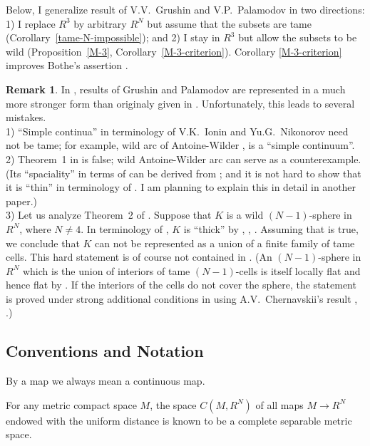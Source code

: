 \documentclass[12pt]{article}
\theoremstyle{definition}
\newtheorem{remark}[theorem]{Remark}
\begin{document}
Below, I generalize
result of V.V.~Grushin and V.P.~Palamodov in two directions:
1)
I 
replace $R^3$ by arbitrary $R^N$
but assume that the subsets are
tame  (Corollary~\ref{tame-N-impossible});
and 2)
I stay in $R^3$ but allow
the subsets to be wild (Proposition~\ref{M-3}, Corollary~\ref{M-3-criterion}). 
Corollary \ref{M-3-criterion} 
improves Bothe's assertion \cite{Bothe-review}.
 

\begin{remark}
In \cite{IN}, results of Grushin and Palamodov 
are represented in a much more stronger form than originaly given in \cite{GP}.
Unfortunately, this leads to several mistakes.
\\
1) ``Simple continua'' in terminology
of V.K.~Ionin and Yu.G.~Nikonorov need not be tame;
for example,
wild arc of Antoine-Wilder 
\cite[{\bf 54--58}, p.65--70]{Antoine-diss},   
\cite[Exercise 2.7.3]{Rushing}
is a ``simple continuum''.
\\
2) Theorem~1 in \cite{IN} is false;
wild Antoine-Wilder arc can serve as a counterexample.
(Its ``spaciality'' in terms of \cite{IN} 
can be derived from 
\cite[{\bf 56--57}, p.66--69]{Antoine-diss};
and it is not hard to show that
it is ``thin'' in terminology of \cite{IN}.
I am planning to explain this in detail
in another paper.)
\\
3) 
Let us analyze Theorem~2 of \cite{IN}.
Suppose that $K$ is a wild $(N-1)$-sphere in $R^N$,
where $N\neq 4$.
 In terminology of \cite{IN}, $K$ is ``thick'' 
by 
\cite{Bing-abstr}, \cite[Thm. 10.5]{Burgess-75}, \cite[p.383, Thm. 3C.2]{Daverman}. Assuming that \cite[Thm. 2]{IN}
is true, we conclude that $K$ can not be 
represented as a union
of a finite family of tame 
cells. This hard statement is of course
not contained in \cite{GP}.
(An $(N-1)$-sphere in $R^N$
which is the union of interiors
of tame $(N-1)$-cells is itself locally
flat and hence 
flat by \cite{Brown}.
If the interiors of the cells do not cover 
the sphere, the statement is proved under
strong
additional conditions in
\cite[Thm. 6.4]{CL} 
using A.V.~Chernavskii's result
\cite[Thm.~2]{Cernavsky-union},
\cite{Cernavsky-2006}.)
\end{remark}


\subsection{Conventions and Notation}

By a map we always mean a continuous map.

For any metric compact space $M$,
the space $C(M,R^N)$ 
of all maps $M\to R^N$
endowed with the uniform distance
is known to be a complete separable metric space.
\end{document}

